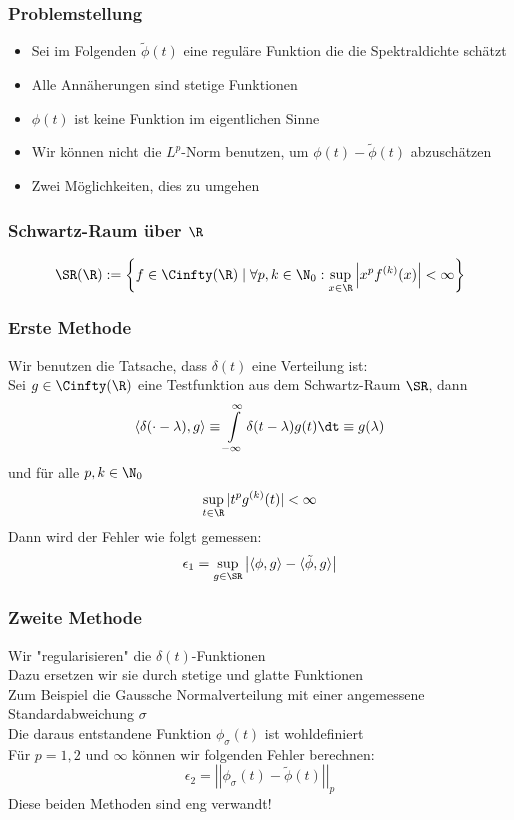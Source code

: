 \begin{frame}
    \frametitle{Problemstellung}
    \begin{itemize}
        \item Sei im Folgenden $\tilde{\phi}(t)$ eine reguläre Funktion die die Spektraldichte schätzt
        \item Alle Annäherungen sind stetige Funktionen
        \item $\phi(t)$ ist keine Funktion im eigentlichen Sinne
        \item Wir können nicht die $L^p$-Norm benutzen, um $\phi(t) - \tilde{\phi}(t)$ abzuschätzen
        \item Zwei Möglichkeiten, dies zu umgehen
    \end{itemize}
\end{frame}

\begin{frame}
    \frametitle{Schwartz-Raum über $\R$}
    $$\SR(\R) := \left\{f \in \Cinfty(\R) \mid \forall p, k \in \N_0: \sup_{x \in \R} \left| x^pf^{(k)}(x)\right| < \infty \right\}$$
\end{frame}

\begin{frame}
    \frametitle{Erste Methode}
    Wir benutzen die Tatsache, dass $\delta(t)$ eine Verteilung ist:\\
    Sei $g \in \Cinfty(\R)$ eine Testfunktion aus dem Schwartz-Raum $\SR$, dann
    $$\langle \delta(\cdot - \lambda), g \rangle \equiv \int\limits_{-\infty}^{\infty} \delta(t - \lambda) g(t) \dt \equiv g(\lambda)$$
    und für alle $p, k \in \N_0$ $$\sup_{t \in \R} |t^pg^{(k)}(t)| < \infty$$
    Dann wird der Fehler wie folgt gemessen: $$\epsilon_1 = \sup_{g \in \SR} \left| \langle \phi, g \rangle - \langle \tilde{\phi}, g \rangle \right|$$
\end{frame}

\begin{frame}
    \frametitle{Zweite Methode}
    Wir "regularisieren" die $\delta(t)$-Funktionen\\
    Dazu ersetzen wir sie durch stetige und glatte Funktionen\\
    Zum Beispiel die Gaussche Normalverteilung mit einer angemessene Standardabweichung $\sigma$\\
    Die daraus entstandene Funktion $\phi_{\sigma}(t)$ ist wohldefiniert\\
    Für $p=1, 2$ und $\infty$ können wir folgenden Fehler berechnen:
    \begin{equation} \label{eq:eps2}
        \epsilon_2 = \left|\left| \phi_{\sigma}(t) - \tilde{\phi}(t) \right|\right|_p
    \end{equation}
    Diese beiden Methoden sind eng verwandt!
\end{frame}

